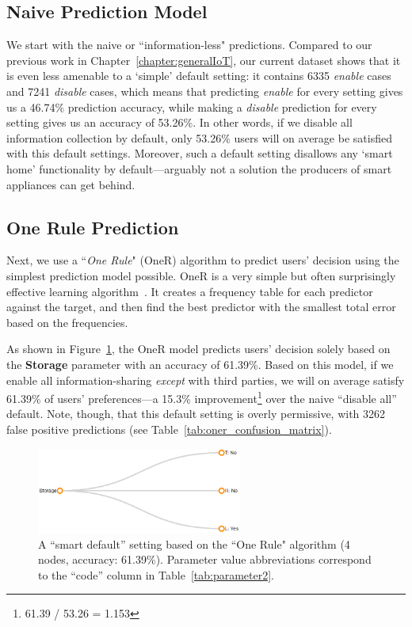 \subsection{Naive Prediction Model}
We start with the naive or ``information-less" predictions. Compared to our previous work in Chapter~\ref{chapter:generalIoT}, our current dataset shows that it is even less amenable to a `simple' default setting: it contains 6335 \emph{enable} cases and 7241 \emph{disable} cases, which means that predicting \textit{enable} for every setting gives us a 46.74\% prediction accuracy, while making a \textit{disable} prediction for every setting gives us an accuracy of 53.26\%. In other words, if we disable all information collection by default, only 53.26\% users will on average be satisfied with this default settings. Moreover, such a default setting disallows any `smart home' functionality by default---arguably not a solution the producers of smart appliances can get behind.

\subsection{One Rule Prediction}\label{subsection:onerule2}
Next, we use a ``\textit{One Rule}" (OneR) algorithm to predict users' decision using the simplest prediction model possible. OneR is a very simple but often surprisingly effective learning algorithm~\cite{Holte1993}. It creates a frequency table for each predictor against the target, and then find the best predictor with the smallest total error based on the frequencies.

As shown in Figure~\ref{fig:oneR}, the OneR model predicts users' decision solely based on the \textbf{Storage} parameter with an accuracy of 61.39\%.  Based on this model, if we enable all information-sharing \emph{except} with third parties, we will on average satisfy 61.39\% of users' preferences---a 15.3\% improvement\footnote{61.39 / 53.26 = 1.153} over the naive ``disable all'' default. Note, though, that this default setting is overly permissive, with 3262 false positive predictions (see Table~\ref{tab:oner_confusion_matrix}).

\begin{figure}
	\centering
	\includegraphics[width=0.6\textwidth]{figures/oneR.png}
	\caption{A ``smart default'' setting based on the ``One Rule" algorithm (4 nodes, accuracy: 61.39\%). Parameter value abbreviations correspond to the ``code'' column in Table~\ref{tab:parameter2}.}
	\label{fig:oneR}
\end{figure}



